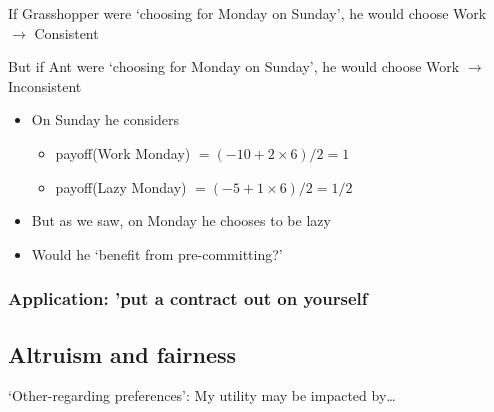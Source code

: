 \documentclass[]{article}
\providecommand{\tightlist}{%
  \setlength{\itemsep}{0pt}\setlength{\parskip}{0pt}}
\begin{document}
\bigskip

If Grasshopper were `choosing for Monday on Sunday', he would choose
Work \(\rightarrow\) Consistent

\bigskip

But if Ant were `choosing for Monday on Sunday', he would choose Work
\(\rightarrow\) Inconsistent

\bigskip

\begin{itemize}
\tightlist
\item
  On Sunday he considers

  \begin{itemize}
  \tightlist
  \item
    payoff(Work Monday) \(= (-10 + 2 \times 6)/2 = 1\)
  \item
    payoff(Lazy Monday) \(= (-5 + 1 \times 6)/2 = 1/2\)
  \end{itemize}
\item
  But as we saw, on Monday he chooses to be lazy
\item
  Would he `benefit from pre-committing?'
\end{itemize}

\hypertarget{application-put-a-contract-out-on-yourself}{%
\subsubsection{Application: 'put a contract out on
yourself}\label{application-put-a-contract-out-on-yourself}}

\hypertarget{altruism-and-fairness}{%
\subsection{Altruism and fairness}\label{altruism-and-fairness}}

`Other-regarding preferences': My utility may be impacted by\ldots{}
\end{document}
